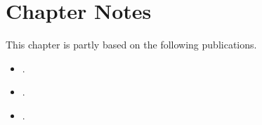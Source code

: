 \clearpage
\section*{Chapter Notes}
This chapter is partly based on the following publications.

\begin{itemize}
  \item {}.
  \item {}.
  \item {}.
\end{itemize}

\clearpage
\printbibliography[heading=subbibliography]